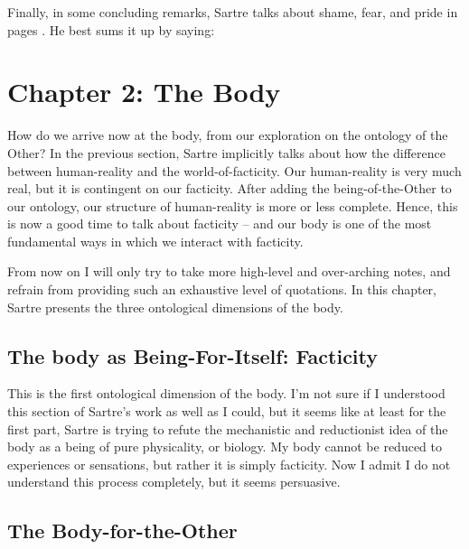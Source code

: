 \noindent
Finally, in some concluding remarks, Sartre talks about shame, fear, and pride in pages \autocite[392 -- 395]{sartre}. He best sums it up by saying: 

\section{Chapter 2: The Body}

How do we arrive now at the body, from our exploration on the ontology of the Other? In the previous section, Sartre implicitly talks about how the difference between human-reality and the world-of-facticity. Our human-reality is very much real, but it is contingent on our facticity. After adding the being-of-the-Other to our ontology, our structure of human-reality is more or less complete. Hence, this is now a good time to talk about facticity -- and our body is one of the most fundamental ways in which we interact with facticity. 

From now on I will only try to take more high-level and over-arching notes, and refrain from providing such an exhaustive level of quotations. In this chapter, Sartre presents the three ontological dimensions of the body.

\subsection{The body as Being-For-Itself: Facticity}

This is the first ontological dimension of the body. I'm not sure if I understood this section \autocite[409 -- 453]{sartre} of Sartre's work as well as I could, but it seems like at least for the first part, Sartre is trying to refute the mechanistic and reductionist idea of the body as a being of pure physicality, or biology. My body cannot be reduced to experiences or sensations, but rather it is simply facticity. Now I admit I do not understand this process completely, but it seems persuasive.

\subsection{The Body-for-the-Other}

